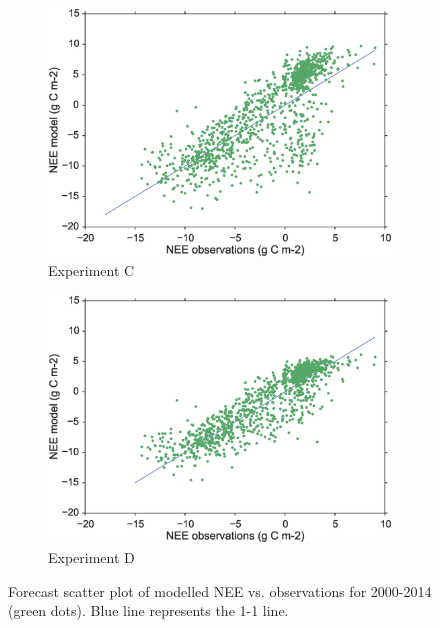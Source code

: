 \documentclass[11pt]{article}
\begin{document}
\begin{figure}
\begin{subfigure}[b]{0.49\textwidth}
        \includegraphics[width=\textwidth]{Cfscat.eps}
        \caption{Experiment C}
        \label{fig:forecastscatBcorR}
    \end{subfigure}
    \begin{subfigure}[b]{0.49\textwidth}
        \includegraphics[width=\textwidth]{Dfscat.eps}
        \caption{Experiment D}
        \label{fig:forecastscatedcBcorR}
    \end{subfigure}
    \caption{Forecast scatter plot of modelled NEE vs. observations for 2000-2014 (green dots). Blue line represents the 1-1 line.}\label{fig:animals}
\end{figure}
\end{document}
